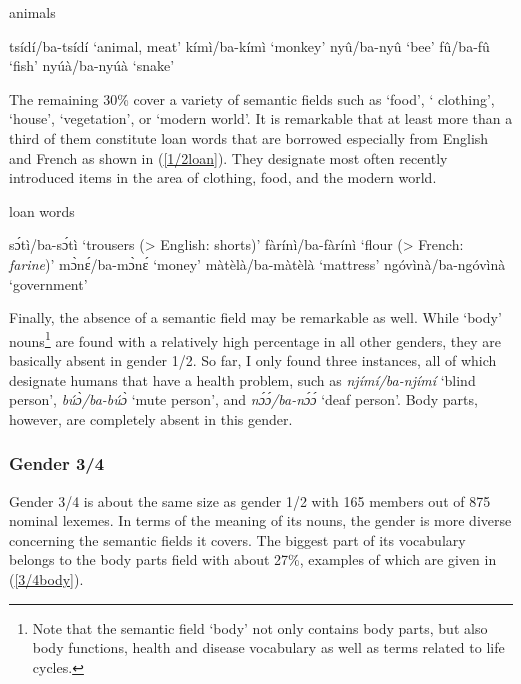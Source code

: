\begin{exe}
\ex\label{1/2animals} animals
\begin{xlist}
\ex tsídí/ba-tsídí `animal, meat'
\ex kímì/ba-kímì `monkey'
\ex nyû/ba-nyû `bee'
\ex fû/ba-fû `fish'
\ex nyúà/ba-nyúà `snake'
\end{xlist}
\end{exe}

\noindent  The remaining 30\% cover a variety of semantic fields such as `food', `
clothing', `house', `vegetation', or `modern world'. It is remarkable that at least more than a third of them constitute loan words that are borrowed especially from English and French as shown in (\ref{1/2loan}). They designate most often recently introduced items in the area of clothing, food, and the modern world.

\begin{exe}
\ex\label{1/2loan} loan words
\begin{xlist}
\ex sɔ́tì/ba-sɔ́tì `trousers (> English: shorts)'
\ex fàrínì/ba-fàrínì `flour (> French: {\itshape farine})'
\ex mɔ̀nɛ́/ba-mɔ̀nɛ́ `money'
\ex màtèlà/ba-màtèlà `mattress'
\ex ngóvìnà/ba-ngóvìnà `government'
\end{xlist}
\end{exe}

\noindent Finally, the absence of a semantic field may be remarkable as well. While `body' nouns\footnote{Note that the semantic field `body' not only contains body parts, but also body functions, health and disease vocabulary as well as terms related to life cycles.} are found with a relatively high percentage in all other genders, they are basically absent in gender 1/2. So far, I only found three instances, all of which designate humans that have a health problem, such as {\itshape njímí/ba-njímí} `blind person', {\itshape búɔ̀/ba-búɔ̀} `mute person', and {\itshape nɔ́ɔ́/ba-nɔ́ɔ́} `deaf person'. Body parts, however, are completely absent in this gender.

\subsubsection{Gender 3/4} 
\label{sec:3/4}

Gender 3/4 is about the same size as gender 1/2 with 165 members out of 875 nominal lexemes. In terms of the meaning of its nouns, the gender is more diverse concerning the semantic fields it covers. The biggest part of its vocabulary belongs to the body parts field with about 27\%, examples of which are given in (\ref{3/4body}).

